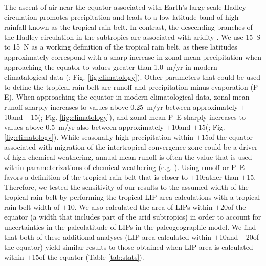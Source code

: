 The ascent of air near the equator associated with Earth's large-scale Hadley circulation promotes precipitation and leads to a low-latitude band of high rainfall known as the tropical rain belt. In contrast, the descending branches of the Hadley circulation in the subtropics are associated with aridity \citep{Manabe1969a}. We use 15\degrees~S to 15\degrees~N as a working definition of the tropical rain belt, as these latitudes approximately correspond with a sharp increase in zonal mean precipitation when approaching the equator to values greater than 1.0~m/yr in modern climatalogical data (\citealp{Kalnay1996a}; Fig. \ref{fig:climatology}). Other parameters that could be used to define the tropical rain belt are runoff and precipitation minus evaporation (P--E). When approaching the equator in modern climatological data, zonal mean runoff sharply increases to values above 0.25~m/yr between approximately $\pm$10\degrees and $\pm$15\degrees (\citealp{Fekete1999a}; Fig. \ref{fig:climatology}), and zonal mean P--E sharply increases to values above 0.5~m/yr also between approximately $\pm$10\degrees and $\pm$15\degrees (\citealp{Trenberth2011a}; Fig. \ref{fig:climatology}). While seasonally high precipitation within $\pm$15\degrees of the equator associated with migration of the intertropical convergence zone could be a driver of high chemical weathering, annual mean runoff is often the value that is used within parameterizations of chemical weathering (e.g. \citealp{West2012a}). Using runoff or P--E favors a definition of the tropical rain belt that is closer to $\pm$10\degrees rather than $\pm$15\degrees. Therefore, we tested the sensitivity of our results to the assumed width of the tropical rain belt by performing the tropical LIP area calculations with a tropical rain belt width of $\pm$10\degrees. We also calculated the area of LIPs within $\pm$20\degrees of the equator (a width that includes part of the arid subtropics) in order to account for uncertainties in the paleolatitude of LIPs in the paleogeographic model. We find that both of these additional analyses (LIP area calculated within $\pm$10\degrees and $\pm$20\degrees of the equator) yield similar results to those obtained when LIP area is calculated within $\pm$15\degrees of the equator (Table \ref{tab:stats}).

